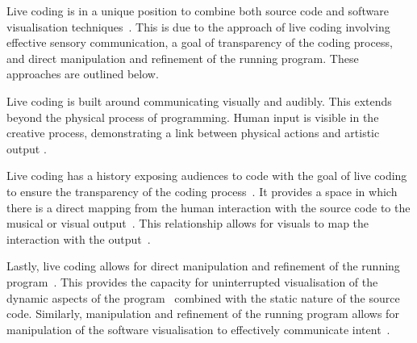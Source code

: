 
Live coding is in a unique position to combine both source code and software visualisation techniques~\cite{McLean2010a}. This is due to the approach of live coding involving effective sensory communication, a goal of transparency of the coding process, and direct manipulation and refinement of the running program. These approaches are outlined below.

Live coding is built around communicating visually and audibly. This extends beyond the physical process of programming. Human input is visible in the creative process, demonstrating a link between physical actions and artistic output \cite{Mclean}.

Live coding has a history exposing audiences to code with the goal of live coding to ensure the transparency of the coding process~\cite{Collins2011,McLean2010a}. It provides a space in which there is a direct mapping from the human interaction with the source code to the musical or visual output~\cite{Mclean}. This relationship allows for visuals to map the interaction with the output~.

Lastly, live coding allows for direct manipulation and refinement of the running program~\cite{Swift2013}. This provides the capacity for uninterrupted visualisation of the dynamic aspects of the program~ combined with the static nature of the source code. Similarly, manipulation and refinement of the running program allows for manipulation of the software visualisation to effectively communicate intent~.




